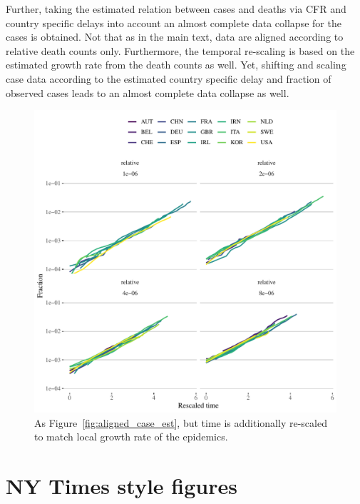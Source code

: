 \documentclass[fullpage,a4paper]{article}
\newcommand{\fig}[1]{Figure~\ref{fig:#1}}
\begin{document}
Further, taking the estimated relation between cases and deaths via
CFR and country specific delays into account an almost complete data
collapse for the cases is obtained. Not that as in the main text, data
are aligned according to relative death counts only. Furthermore, the
temporal re-scaling is based on the estimated growth rate from the
death counts as well. Yet, shifting and scaling case data according to
the estimated country specific delay and fraction of observed cases
leads to an almost complete data collapse as well.
\begin{figure}
  \includegraphics[width=1\textwidth]{../figs/ecdc_scaling_estdelay_cases.pdf}
  \caption{\label{fig:scaling_case_est} As \fig{aligned_case_est}, but
    time is additionally re-scaled to match local growth rate of the
    epidemics.}
\end{figure}


\section{NY Times style figures}
\end{document}
